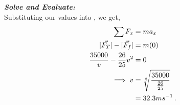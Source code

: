 \begin{subquestions}
\begin{subsubquestions}
\textbf{\textit{Solve and Evaluate:}} \\
Substituting our values into , we get,
\begin{align}
	\sum F_x & = ma_x \nonumber \\
	|\vec{F_T}|-|\vec{F_f}| & = m(0) \nonumber \\
	\frac{35000}{v} - \frac{26}{25}v^2 & = 0 \nonumber \\
	\implies v & = \sqrt[3]{\frac{35000}{\frac{26}{25}}} \nonumber \\
	           & = 32.3 ms^{-1} \,.
\end{align}

\end{subsubquestions}
	
\end{subquestions}










